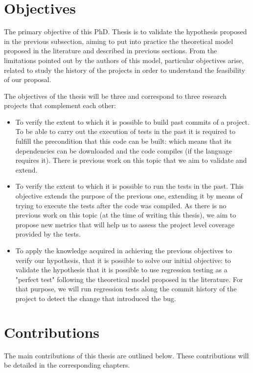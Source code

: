 \section{Objectives}

The primary objective of this PhD. Thesis is to validate the hypothesis proposed in the previous subsection, aiming to put into practice the theoretical model proposed in the literature and described in previous sections.
From the limitations pointed out by the authors of this model, particular objectives arise, related to study the history of the projects in order to understand the feasibility of our proposal.

The objectives of the thesis will be three and correspond to three research projects that complement each other:

\begin{itemize}
    \item To verify the extent to which it is possible to build past commits of a project. To be able to carry out the execution of tests in the past it is required to fulfill the precondition that this code can be built: which means that its dependencies can be downloaded and the code compiles (if the language requires it). 
    There is previous work on this topic that we aim to validate and extend.
    \item To verify the extent to which it is possible to run the tests in the past. This objective extends the purpose of the previous one, extending it by means of trying to execute the tests after the code was compiled. As there is no previous work on this topic (at the time of writing this thesis), we aim to propose new metrics that will help us to assess the project level coverage provided by the tests.
    \item To apply the knowledge acquired in achieving the previous objectives to verify our hypothesis, that it is possible to solve our initial objective: to validate the hypothesis that it is possible to use regression testing as a "perfect test" following the theoretical model proposed in the literature.
    For that purpose, we will run regression tests along the commit history of the project to detect the change that introduced the bug.
\end{itemize}

\section{Contributions}

The main contributions of this thesis are outlined below.
These contributions will be detailed in the corresponding chapters.

